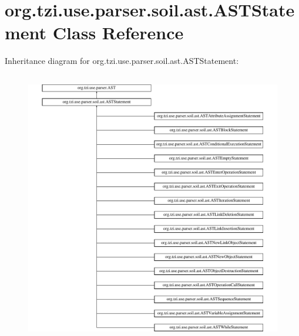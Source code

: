 \hypertarget{classorg_1_1tzi_1_1use_1_1parser_1_1soil_1_1ast_1_1_a_s_t_statement}{\section{org.\-tzi.\-use.\-parser.\-soil.\-ast.\-A\-S\-T\-Statement Class Reference}
\label{classorg_1_1tzi_1_1use_1_1parser_1_1soil_1_1ast_1_1_a_s_t_statement}
}
Inheritance diagram for org.\-tzi.\-use.\-parser.\-soil.\-ast.\-A\-S\-T\-Statement\-:\begin{figure}[H]
\begin{center}
\leavevmode
\includegraphics[height=12.000000cm]{classorg_1_1tzi_1_1use_1_1parser_1_1soil_1_1ast_1_1_a_s_t_statement}
\end{center}
\end{figure}
